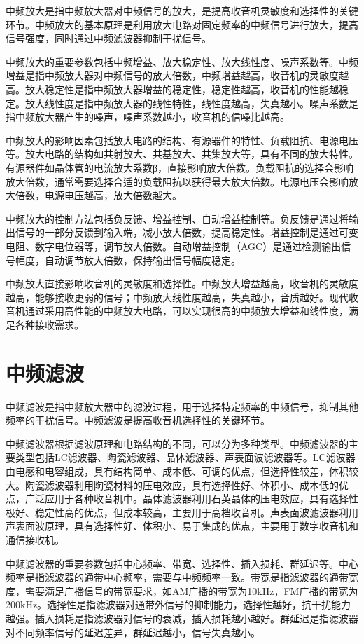 \documentclass[12pt,UTF8]{ctexbook}
\begin{document}
中频放大是指中频放大器对中频信号的放大，是提高收音机灵敏度和选择性的关键环节。中频放大的基本原理是利用放大电路对固定频率的中频信号进行放大，提高信号强度，同时通过中频滤波器抑制干扰信号。

中频放大的重要参数包括中频增益、放大稳定性、放大线性度、噪声系数等。中频增益是指中频放大器对中频信号的放大倍数，中频增益越高，收音机的灵敏度越高。放大稳定性是指中频放大器增益的稳定性，稳定性越高，收音机的性能越稳定。放大线性度是指中频放大器的线性特性，线性度越高，失真越小。噪声系数是指中频放大器产生的噪声，噪声系数越小，收音机的信噪比越高。

中频放大的影响因素包括放大电路的结构、有源器件的特性、负载阻抗、电源电压等。放大电路的结构如共射放大、共基放大、共集放大等，具有不同的放大特性。有源器件如晶体管的电流放大系数β，直接影响放大倍数。负载阻抗的选择会影响放大倍数，通常需要选择合适的负载阻抗以获得最大放大倍数。电源电压会影响放大倍数，电源电压越高，放大倍数越大。

中频放大的控制方法包括负反馈、增益控制、自动增益控制等。负反馈是通过将输出信号的一部分反馈到输入端，减小放大倍数，提高稳定性。增益控制是通过可变电阻、数字电位器等，调节放大倍数。自动增益控制（AGC）是通过检测输出信号幅度，自动调节放大倍数，保持输出信号幅度稳定。

中频放大直接影响收音机的灵敏度和选择性。中频放大增益越高，收音机的灵敏度越高，能够接收更弱的信号；中频放大线性度越高，失真越小，音质越好。现代收音机通过采用高性能的中频放大电路，可以实现很高的中频放大增益和线性度，满足各种接收需求。

\section{中频滤波}

中频滤波是指中频放大器中的滤波过程，用于选择特定频率的中频信号，抑制其他频率的干扰信号。中频滤波是提高收音机选择性的关键环节。

中频滤波器根据滤波原理和电路结构的不同，可以分为多种类型。中频滤波器的主要类型包括LC滤波器、陶瓷滤波器、晶体滤波器、声表面波滤波器等。LC滤波器由电感和电容组成，具有结构简单、成本低、可调的优点，但选择性较差，体积较大。陶瓷滤波器利用陶瓷材料的压电效应，具有选择性好、体积小、成本低的优点，广泛应用于各种收音机中。晶体滤波器利用石英晶体的压电效应，具有选择性极好、稳定性高的优点，但成本较高，主要用于高档收音机。声表面波滤波器利用声表面波原理，具有选择性好、体积小、易于集成的优点，主要用于数字收音机和通信接收机。

中频滤波器的重要参数包括中心频率、带宽、选择性、插入损耗、群延迟等。中心频率是指滤波器的通带中心频率，需要与中频频率一致。带宽是指滤波器的通带宽度，需要满足广播信号的带宽要求，如AM广播的带宽为10kHz，FM广播的带宽为200kHz。选择性是指滤波器对通带外信号的抑制能力，选择性越好，抗干扰能力越强。插入损耗是指滤波器对信号的衰减，插入损耗越小越好。群延迟是指滤波器对不同频率信号的延迟差异，群延迟越小，信号失真越小。
\end{document}
